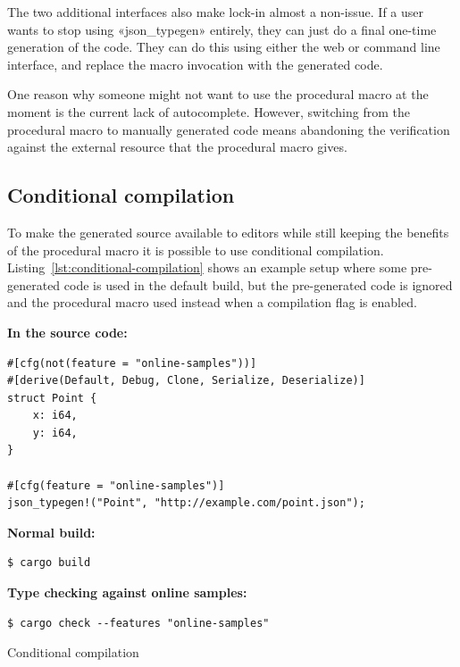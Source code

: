 The two additional interfaces also make lock-in almost a non-issue. If a user wants to stop using «json_typegen» entirely, they can just do a final one-time generation of the code. They can do this using either the web or command line interface, and replace the macro invocation with the generated code.

One reason why someone might not want to use the procedural macro at the moment is the current lack of autocomplete. However, switching from the procedural macro to manually generated code means abandoning the verification against the external resource that the procedural macro gives.

\subsection{Conditional compilation}


To make the generated source available to editors while still keeping the benefits of the procedural macro it is possible to use conditional compilation. Listing~\ref{lst:conditional-compilation} shows an example setup where some pre-generated code is used in the default build, but the pre-generated code is ignored and the procedural macro used instead when a compilation flag is enabled.

\begin{listing}[ht!]
\textbf{In the source code:}
\begin{verbatim}
#[cfg(not(feature = "online-samples"))]
#[derive(Default, Debug, Clone, Serialize, Deserialize)]
struct Point {
    x: i64,
    y: i64,
}

#[cfg(feature = "online-samples")]
json_typegen!("Point", "http://example.com/point.json");
\end{verbatim}
\vspace{5mm}

\textbf{Normal build:}
\begin{verbatim}
$ cargo build
\end{verbatim}
\vspace{5mm}

\textbf{Type checking against online samples:}
\begin{verbatim}
$ cargo check --features "online-samples"
\end{verbatim}
\caption{Conditional compilation}
\label{lst:conditional-compilation}
\end{listing}

